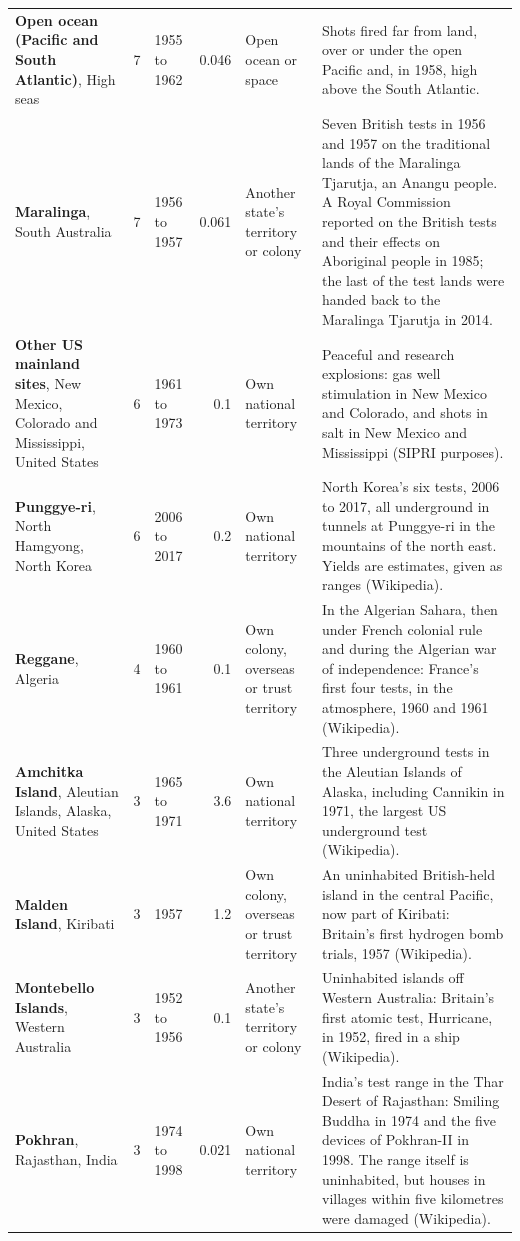 \documentclass[11pt,a4paper]{article}
\begin{document}
{\begin{longtable}{p{3.3cm}rp{1.2cm}rp{2.2cm}p{5.6cm}}
\textbf{Open ocean (Pacific and South Atlantic)}, High seas & 7 & 1955 to 1962 & 0.046 & Open ocean or space & Shots fired far from land, over or under the open Pacific and, in 1958, high above the South Atlantic.\\
\textbf{Maralinga}, South Australia & 7 & 1956 to 1957 & 0.061 & Another state's territory or colony & Seven British tests in 1956 and 1957 on the traditional lands of the Maralinga Tjarutja, an Anangu people. A Royal Commission reported on the British tests and their effects on Aboriginal people in 1985; the last of the test lands were handed back to the Maralinga Tjarutja in 2014.\\
\textbf{Other US mainland sites}, New Mexico, Colorado and Mississippi, United States & 6 & 1961 to 1973 & 0.1 & Own national territory & Peaceful and research explosions: gas well stimulation in New Mexico and Colorado, and shots in salt in New Mexico and Mississippi (SIPRI purposes).\\
\textbf{Punggye-ri}, North Hamgyong, North Korea & 6 & 2006 to 2017 & 0.2 & Own national territory & North Korea's six tests, 2006 to 2017, all underground in tunnels at Punggye-ri in the mountains of the north east. Yields are estimates, given as ranges (Wikipedia).\\
\textbf{Reggane}, Algeria & 4 & 1960 to 1961 & 0.1 & Own colony, overseas or trust territory & In the Algerian Sahara, then under French colonial rule and during the Algerian war of independence: France's first four tests, in the atmosphere, 1960 and 1961 (Wikipedia).\\
\textbf{Amchitka Island}, Aleutian Islands, Alaska, United States & 3 & 1965 to 1971 & 3.6 & Own national territory & Three underground tests in the Aleutian Islands of Alaska, including Cannikin in 1971, the largest US underground test (Wikipedia).\\
\textbf{Malden Island}, Kiribati & 3 & 1957 & 1.2 & Own colony, overseas or trust territory & An uninhabited British-held island in the central Pacific, now part of Kiribati: Britain's first hydrogen bomb trials, 1957 (Wikipedia).\\
\textbf{Montebello Islands}, Western Australia & 3 & 1952 to 1956 & 0.1 & Another state's territory or colony & Uninhabited islands off Western Australia: Britain's first atomic test, Hurricane, in 1952, fired in a ship (Wikipedia).\\
\textbf{Pokhran}, Rajasthan, India & 3 & 1974 to 1998 & 0.021 & Own national territory & India's test range in the Thar Desert of Rajasthan: Smiling Buddha in 1974 and the five devices of Pokhran-II in 1998. The range itself is uninhabited, but houses in villages within five kilometres were damaged (Wikipedia).\\

\end{longtable}}
\end{document}
